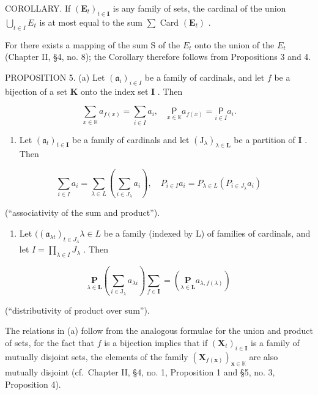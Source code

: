 COROLLARY. If \((\mathbf{E}_{t})_{t\in\mathbf{I}}\) is any family of sets, the cardinal of the union \(\bigcup_{t\in I}E_{t}\) is at most equal to the sum \(\sum\) Card \((\mathbf{E}_{t})\) .

For there exists a mapping of the sum S of the \(E_{t}\) onto the union of the \(E_{t}\) (Chapter II, §4, no. 8); the Corollary therefore follows from Propositions 3 and 4.

PROPOSITION 5. (a) Let \((\mathfrak{a}_i)_{i\in I}\) be a family of cardinals, and let \(f\) be a bijection of a set \(\mathbf{K}\) onto the index set \(\mathbf{I}\) . Then

\[
\sum_ {x \in \mathbb {K}} a _ {f (x)} = \sum_ {i \in I} a _ {i}, \quad \underset {x \in \mathbb {K}} {\mathsf {P}} a _ {f (x)} = \underset {i \in I} {\mathsf {P}} a _ {i}.
\]

\begin{enumerate}
\def\labelenumi{(\alph{enumi})}
\setcounter{enumi}{1}
\tightlist
\item
  Let \((\mathfrak{a}_t)_{t\in \mathbf{I}}\) be a family of cardinals and let \((\mathrm{J}_{\lambda})_{\lambda \in \mathbf{L}}\) be a partition of \(\mathbf{I}\) . Then
\end{enumerate}

\[
\sum_ {i \in I} a _ {i} = \sum_ {\lambda \in L} \left(\sum_ {i \in J _ {\lambda}} a _ {i}\right), \quad P _ {i \in I} a _ {i} = P _ {\lambda \in L} \left(P _ {i \in J _ {\lambda}} a _ {i}\right)
\]

(``associativity of the sum and product'').

\begin{enumerate}
\def\labelenumi{(\alph{enumi})}
\setcounter{enumi}{2}
\tightlist
\item
  Let \(((\mathfrak{a}_{\lambda t})_{t\in J_{\lambda}}\lambda \in L\) be a family (indexed by L) of families of cardinals, and let \(I = \prod_{\lambda \in I}J_{\lambda}\) . Then
\end{enumerate}

\[
\underset {\lambda \in \mathbf {L}} {\mathbf {P}} \left(\sum_ {i \in \mathrm{J} _ {\lambda}} a _ {\lambda i}\right) \underset {f \in \mathbf {I}} {\sum} = \left(\underset {\lambda \in \mathbf {L}} {\mathbf {P}} a _ {\lambda , f (\lambda)}\right)
\]

(``distributivity of product over sum'').

The relations in (a) follow from the analogous formulae for the union and product of sets, for the fact that \(f\) is a bijection implies that if \((\mathbf{X}_t)_{i \in \mathbf{I}}\) is a family of mutually disjoint sets, the elements of the family \((\mathbf{X}_{f(\mathbf{x})})_{\mathbf{x} \in \mathbb{K}}\) are also mutually disjoint (cf.~Chapter II, §4, no. 1, Proposition 1 and §5, no. 3, Proposition 4).

